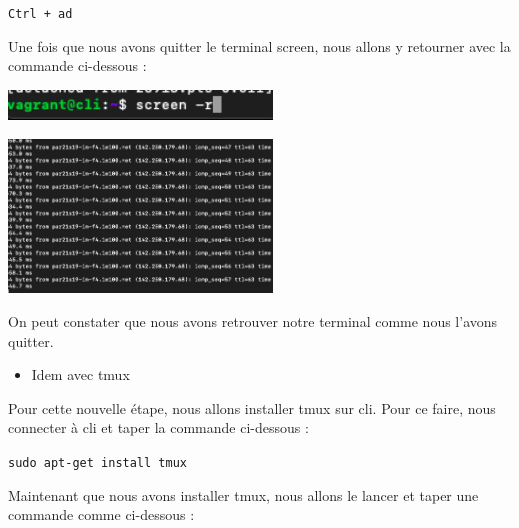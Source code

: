 \documentclass[12pt]{article}
\begin{document}
\texttt{Ctrl + ad}

\newpage

\vspace{0.3cm}

Une fois que nous avons quitter le terminal screen, nous allons y retourner avec la commande ci-dessous : 

\vspace{0.3cm}

\begin{center}
  \includegraphics[width=7cm]{Image-TD-SSH-9/screen_r.png}
\end{center}

\vspace{0.3cm}

\begin{center}
  \includegraphics[width=7cm]{Image-TD-SSH-9/screen-return.png}
\end{center}

\vspace{0.3cm}

On peut constater que nous avons retrouver notre terminal comme nous l'avons quitter.

\vspace{0.3cm}

\begin{itemize}
  \item Idem avec tmux
\end{itemize}

\vspace{0.3cm}

Pour cette nouvelle étape, nous allons installer tmux sur cli. Pour ce faire, nous connecter à cli et taper la commande ci-dessous : 

\texttt{sudo apt-get install tmux}

\vspace{0.3cm}

Maintenant que nous avons installer tmux, nous allons le lancer et taper une commande comme ci-dessous  : 
\end{document}
